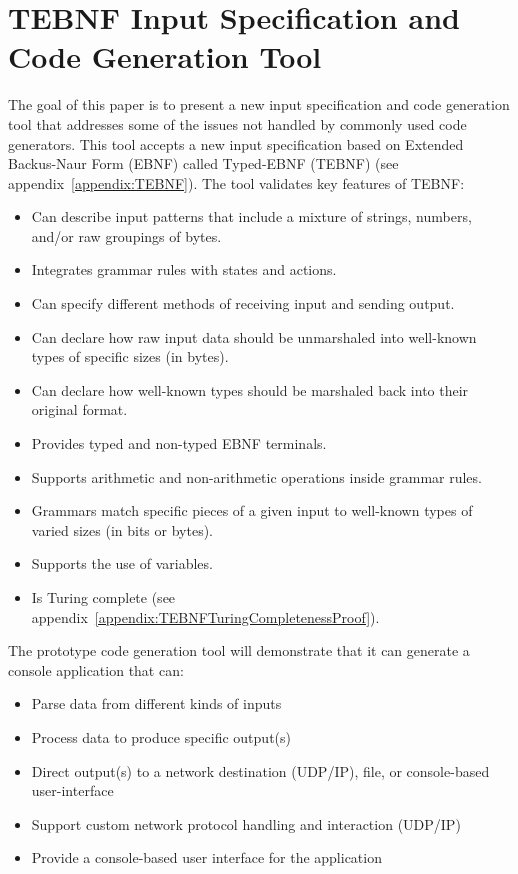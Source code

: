 \section{TEBNF Input Specification and Code Generation Tool}
The goal of this paper is to present a new input specification and code generation tool that addresses some of the issues not handled by commonly used code generators.  This tool accepts a new input specification based on Extended Backus-Naur Form (EBNF) called Typed-EBNF (TEBNF) (see appendix~\ref{appendix:TEBNF}).  The tool validates key features of TEBNF:
\begin{itemize}
  \item Can describe input patterns that include a mixture of strings, numbers, and/or raw groupings of bytes.
  \item Integrates grammar rules with states and actions.
  \item Can specify different methods of receiving input and sending output.
  \item Can declare how raw input data should be unmarshaled into well-known types of specific sizes (in bytes).
  \item Can declare how well-known types should be marshaled back into their original format.
  \item Provides typed and non-typed EBNF terminals.
  \item Supports arithmetic and non-arithmetic operations inside grammar rules.
  \item Grammars match specific pieces of a given input to well-known types of varied sizes (in bits or bytes).
  \item Supports the use of variables.
  \item Is Turing complete (see appendix~\ref{appendix:TEBNFTuringCompletenessProof}).
\end{itemize}

\indent
The prototype code generation tool will demonstrate that it can generate a console application that can:
\begin{itemize}
  \item Parse data from different kinds of inputs
  \item Process data to produce specific output(s)
  \item Direct output(s) to a network destination (UDP/IP), file, or console-based user-interface
  \item Support custom network protocol handling and interaction (UDP/IP)
  \item Provide a console-based user interface for the application
\end{itemize}




